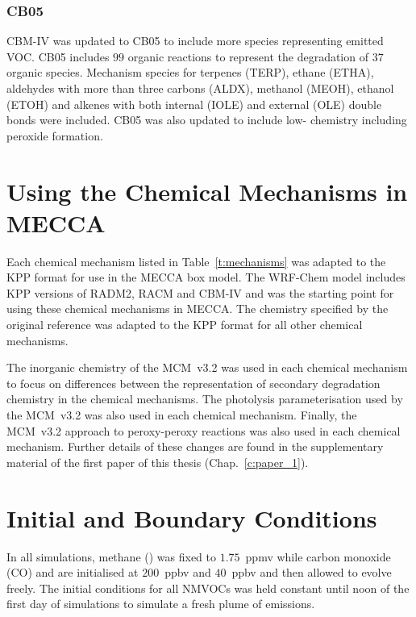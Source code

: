 \subsubsection{CB05}
CBM-IV was updated to CB05 \citep{Yarwood:2005} to include more species representing emitted VOC.
CB05 includes $99$ organic reactions to represent the degradation of $37$ organic species.
Mechanism species for terpenes (TERP), ethane (ETHA), aldehydes with more than three carbons (ALDX), methanol (MEOH), ethanol (ETOH) and alkenes with both internal (IOLE) and external (OLE) double bonds were included.  
CB05 was also updated to include low- chemistry including peroxide formation.

\section{Using the Chemical Mechanisms in MECCA}
Each chemical mechanism listed in Table~\ref{t:mechanisms} was adapted to the KPP format for use in the MECCA box model.
The WRF-Chem model \citep{Grell:2005} includes KPP versions of RADM2, RACM and CBM-IV and was the starting point for using these chemical mechanisms in MECCA.
The chemistry specified by the original reference was adapted to the KPP format for all other chemical mechanisms.

The inorganic chemistry of the MCM~v3.2 was used in each chemical mechanism to focus on differences between the representation of secondary degradation chemistry in the chemical mechanisms.
The photolysis parameterisation used by the MCM~v3.2 was also used in each chemical mechanism.
Finally, the MCM~v3.2 approach to peroxy-peroxy reactions was also used in each chemical mechanism.
Further details of these changes are found in the supplementary material of the first paper of this thesis (Chap.~\ref{c:paper_1}). 

\section{Initial and Boundary Conditions}
In all simulations, methane () was fixed to $1.75$~ppmv while carbon monoxide (CO) and  are initialised at $200$~ppbv and $40$~ppbv and then allowed to evolve freely.
The initial conditions for all NMVOCs was held constant until noon of the first day of simulations to simulate a fresh plume of emissions.

